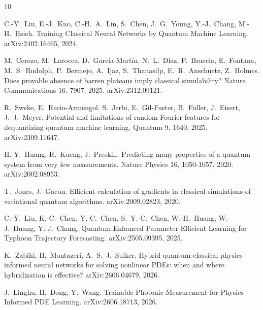 \documentclass[10pt,a4paper]{article}
\begin{document}
\begin{thebibliography}{10}
\footnotesize

C.-Y.\ Liu, E.-J.\ Kuo, C.-H.\ A.\ Lin, S.\ Chen, J.\ G.\ Young, Y.-J.\ Chang, M.-H.\ Hsieh.
\newblock Training Classical Neural Networks by Quantum Machine Learning.
\newblock arXiv:2402.16465, 2024.

M.\ Cerezo, M.\ Larocca, D.\ Garc\'ia-Mart\'in, N.\ L.\ Diaz, P.\ Braccia, E.\ Fontana, M.\ S.\ Rudolph, P.\ Bermejo, A.\ Ijaz, S.\ Thanasilp, E.\ R.\ Anschuetz, Z.\ Holmes.
\newblock Does provable absence of barren plateaus imply classical simulability?
\newblock Nature Communications 16, 7907, 2025. arXiv:2312.09121.

R.\ Sweke, E.\ Recio-Armengol, S.\ Jerbi, E.\ Gil-Fuster, B.\ Fuller, J.\ Eisert, J.\ J.\ Meyer.
\newblock Potential and limitations of random Fourier features for dequantizing quantum machine learning.
\newblock Quantum 9, 1640, 2025. arXiv:2309.11647.

H.-Y.\ Huang, R.\ Kueng, J.\ Preskill.
\newblock Predicting many properties of a quantum system from very few measurements.
\newblock Nature Physics 16, 1050-1057, 2020. arXiv:2002.08953.

T.\ Jones, J.\ Gacon.
\newblock Efficient calculation of gradients in classical simulations of variational quantum algorithms.
\newblock arXiv:2009.02823, 2020.

C.-Y.\ Liu, K.-C.\ Chen, Y.-C.\ Chen, S.\ Y.-C.\ Chen, W.-H.\ Huang, W.-J.\ Huang, Y.-J.\ Chang.
\newblock Quantum-Enhanced Parameter-Efficient Learning for Typhoon Trajectory Forecasting.
\newblock arXiv:2505.09395, 2025.

K.\ Zabihi, H.\ Montazeri, A.\ S.\ J.\ Suiker.
\newblock Hybrid quantum-classical physics-informed neural networks for solving nonlinear PDEs: when and where hybridization is effective?
\newblock arXiv:2606.04679, 2026.

J.\ Linghu, H.\ Dong, Y.\ Wang.
\newblock Trainable Photonic Measurement for Physics-Informed PDE Learning.
\newblock arXiv:2606.18713, 2026.

\end{thebibliography}
\end{document}
